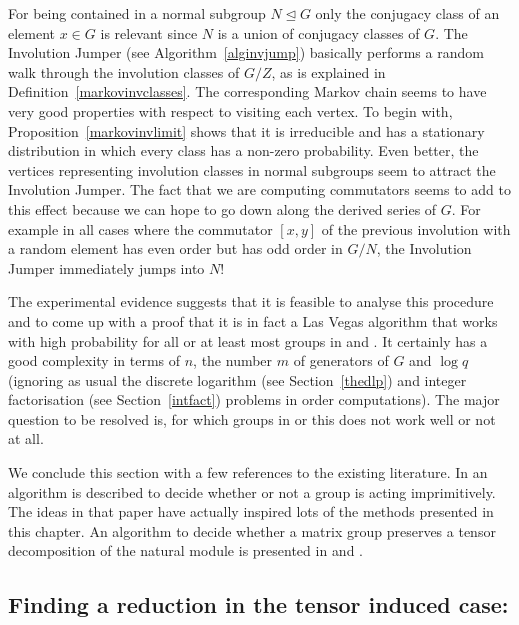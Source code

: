 \begin{Expl}
%
For being contained in a normal subgroup $N \unlhd G$ only the
conjugacy class of an element $x \in G$ is relevant since $N$ is a union of
conjugacy classes of $G$. The Involution Jumper (see Algorithm~\ref{alginvjump}) 
basically performs a random walk through the involution classes of $G/Z$,
as is explained in Definition~\ref{markovinvclasses}. 
The corresponding Markov chain seems to have very good properties with
respect to visiting each vertex. 
To begin with, Proposition~\ref{markovinvlimit} shows that it is irreducible
and has a stationary distribution in which every class has a non-zero 
probability. Even better, the vertices representing
involution classes in normal subgroups seem to attract the Involution
Jumper. The fact that we are computing commutators seems to add to this
effect because we can hope to go down along the derived series of $G$.
For example in all cases where the commutator $[x,y]$ of the previous
involution with a random element has even order but has odd order in
$G/N$, the Involution Jumper immediately jumps into $N$!

The experimental evidence suggests that it is feasible to analyse this
procedure and to come up with a proof that it is in fact a Las Vegas
algorithm that works with high probability for all or at least most groups
in  and . It certainly has a good complexity in terms of $n$, the
number $m$ of generators of $G$ and $\log q$ (ignoring as usual the
discrete logarithm (see Section~\ref{thedlp}) and integer factorisation 
(see Section~\ref{intfact}) problems in order computations). 
The major question to be
resolved is, for which groups in  or  this
does not work well or not at all.
\end{Expl}

\smallskip
We conclude this section with a few references to the existing
literature. In \cite{smashnormal} an algorithm is described to decide
whether or not a group is acting imprimitively. The ideas in that
paper have actually inspired lots of the methods presented in this
chapter. An algorithm to decide whether a matrix group preserves a
tensor decomposition of the natural module is presented in
\cite{tensprodproj} and \cite{LGO97}.


\subsection{Finding a reduction in the tensor induced case: }
\label{solveD7}

